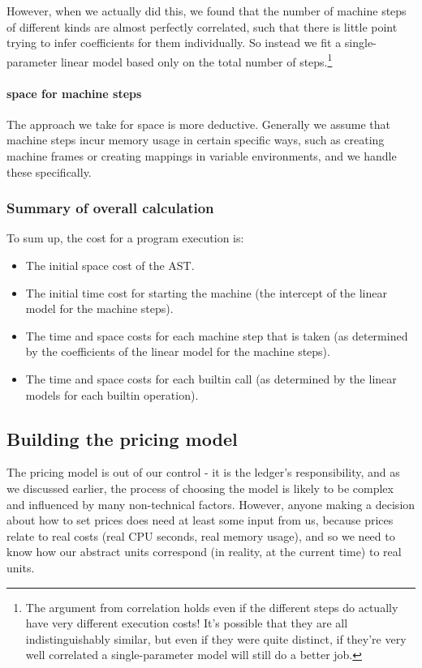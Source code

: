 However, when we actually did this, we found that the number of machine steps of different kinds are almost perfectly correlated, such that there is little point trying to infer coefficients for them individually.
So instead we fit a single-parameter linear model based only on the total number of steps.\footnote{
The argument from correlation holds even if the different steps do actually have very different execution costs!
It's possible that they are all indistinguishably similar, but even if they were quite distinct, if they're very well correlated a single-parameter model will still do a better job.
}

\paragraph{\gls{space} for machine steps}
The approach we take for \gls{space} is more deductive.
Generally we assume that machine steps incur memory usage in certain specific ways, such as creating machine frames or creating mappings in variable environments, and we handle these specifically.

\subsubsection{Summary of overall calculation}
To sum up, the cost for a program execution is:
\begin{itemize}
\item The initial \gls{space} cost of the AST.
\item The initial \gls{time} cost for starting the machine (the intercept of the linear model for the machine steps).
\item The \gls{time} and \gls{space} costs for each machine step that is taken (as determined by the coefficients of the linear model for the machine steps).
\item The \gls{time} and \gls{space} costs for each builtin call (as determined by the linear models for each builtin operation).
\end{itemize}

\subsection{Building the pricing model}
The pricing model is out of our control - it is the ledger's responsibility, and as we discussed earlier, the process of choosing the model is likely to be complex and influenced by many non-technical factors.
However, anyone making a decision about how to set prices does need at least some input from us, because prices relate to real costs (real CPU seconds, real memory usage), and so we need to know how our abstract units correspond (in reality, at the current time) to real units.

